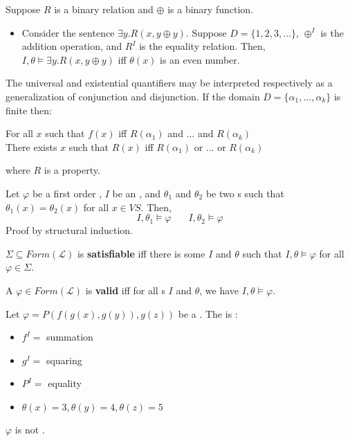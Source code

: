 \documentclass[english, 11pt]{article}
\begin{document}
  \begin{exmp}
    Suppose $R$ is a binary relation and $\oplus$ is a binary function.
    \begin{itemize}
      \item Consider the sentence $\exists y. R(x,y\oplus y)$. Suppose $D = \{1,2,3,\ldots\}$, $\oplus^I$ is the addition operation, and $R^I$ is the equality relation. Then, $I,\theta \models \exists y. R(x,y\oplus y)$ iff $\theta (x)$ is an even number.
    \end{itemize}
  \end{exmp}
  The universal and existential quantifiers may be interpreted respectively as a generalization of conjunction and disjunction. If the domain $D = \{\alpha_1,\ldots,\alpha_k\}$ is finite then:
\begin{center}
  For all $x$ such that $f(x)$ iff $R(\alpha_1)$ and ... and $R(\alpha_k)$ \\
  There exists $x$ such that $R(x)$ iff $R(\alpha_1)$ or ... or $R(\alpha_k)$
\end{center}
where $R$ is a property.
\begin{lem}
  Let $\varphi$ be a first order , $I$ be an , and $\theta_1$ and $\theta_2$ be two s such that $\theta_1(x) = \theta_2(x)$ for all $x \in VS$. Then,
  \[ I, \theta_1 \models \varphi \ \ \ \ \ \ \ \ I, \theta_2 \models \varphi \]
  Proof by structural induction.
\end{lem}
\begin{defn}[satisfiable]\label{satisfiablefol}
$\Sigma \subseteq Form(\mathcal{L})$ is \textbf{satisfiable} iff there is some  $I$ and  $\theta$ such that $I, \theta \models \varphi$ for all $\varphi \in \Sigma$.
\end{defn}
\begin{defn}[valid]\label{valid}
A  $\varphi \in Form(\mathcal{L})$ is \textbf{valid} iff for all s $I$ and  $\theta$, we have $I, \theta \models \varphi$.
\end{defn}
\begin{exmp}
  Let $\varphi = P(f(g(x),g(y)),g(z))$ be a . The  is :
  \begin{itemize}
    \item $f^I = $ summation
    \item $g^I = $ squaring
    \item $P^I = $ equality
    \item $\theta(x) = 3, \theta(y) = 4, \theta(z) = 5$
  \end{itemize}
  $\varphi$ is not .
\end{exmp}
\end{document}
